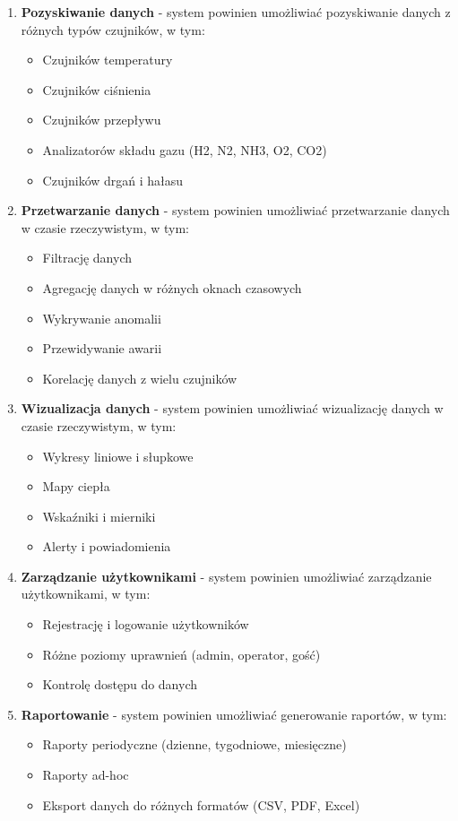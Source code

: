\begin{enumerate}
    \item \textbf{Pozyskiwanie danych} - system powinien umożliwiać pozyskiwanie danych z różnych typów czujników, w tym:
    \begin{itemize}
        \item Czujników temperatury
        \item Czujników ciśnienia
        \item Czujników przepływu
        \item Analizatorów składu gazu (H2, N2, NH3, O2, CO2)
        \item Czujników drgań i hałasu
    \end{itemize}
    
    \item \textbf{Przetwarzanie danych} - system powinien umożliwiać przetwarzanie danych w czasie rzeczywistym, w tym:
    \begin{itemize}
        \item Filtrację danych
        \item Agregację danych w różnych oknach czasowych
        \item Wykrywanie anomalii
        \item Przewidywanie awarii
        \item Korelację danych z wielu czujników
    \end{itemize}
    
    \item \textbf{Wizualizacja danych} - system powinien umożliwiać wizualizację danych w czasie rzeczywistym, w tym:
    \begin{itemize}
        \item Wykresy liniowe i słupkowe
        \item Mapy ciepła
        \item Wskaźniki i mierniki
        \item Alerty i powiadomienia
    \end{itemize}
    
    \item \textbf{Zarządzanie użytkownikami} - system powinien umożliwiać zarządzanie użytkownikami, w tym:
    \begin{itemize}
        \item Rejestrację i logowanie użytkowników
        \item Różne poziomy uprawnień (admin, operator, gość)
        \item Kontrolę dostępu do danych
    \end{itemize}
    
    \item \textbf{Raportowanie} - system powinien umożliwiać generowanie raportów, w tym:
    \begin{itemize}
        \item Raporty periodyczne (dzienne, tygodniowe, miesięczne)
        \item Raporty ad-hoc
        \item Eksport danych do różnych formatów (CSV, PDF, Excel)
    \end{itemize}
\end{enumerate}

